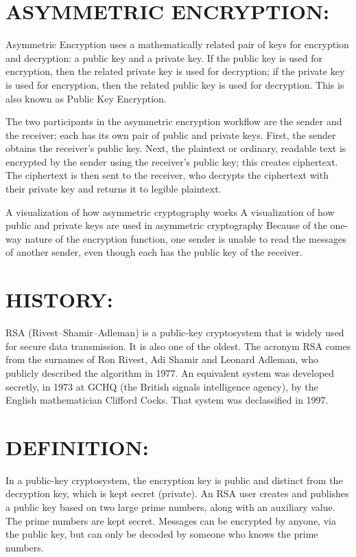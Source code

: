 \documentclass[10pt,fleqn]{article}
\begin{document}
\bigskip{}


\section{ASYMMETRIC ENCRYPTION:}

Asymmetric Encryption uses a mathematically related pair of keys for
encryption and decryption: a public key and a private key. If the
public key is used for encryption, then the related private key is
used for decryption; if the private key is used for encryption, then
the related public key is used for decryption. This is also known
as Public Key Encryption. 

The two participants in the asymmetric encryption workflow are the
sender and the receiver; each has its own pair of public and private
keys. First, the sender obtains the receiver's public key. Next, the
plaintext or ordinary, readable text is encrypted by the sender using
the receiver's public key; this creates ciphertext. The ciphertext
is then sent to the receiver, who decrypts the ciphertext with their
private key and returns it to legible plaintext.

A visualization of how asymmetric cryptography works A visualization
of how public and private keys are used in asymmetric cryptography
Because of the one-way nature of the encryption function, one sender
is unable to read the messages of another sender, even though each
has the public key of the receiver.

\bigskip{}


\section{HISTORY:}

RSA (Rivest--Shamir--Adleman) is a public-key cryptosystem that
is widely used for secure data transmission. It is also one of the
oldest. The acronym RSA comes from the surnames of Ron Rivest, Adi
Shamir and Leonard Adleman, who publicly described the algorithm in
1977. An equivalent system was developed secretly, in 1973 at GCHQ
(the British signals intelligence agency), by the English mathematician
Clifford Cocks. That system was declassified in 1997.

\bigskip{}


\section{DEFINITION:}

In a public-key cryptosystem, the encryption key is public and distinct
from the decryption key, which is kept secret (private). An RSA user
creates and publishes a public key based on two large prime numbers,
along with an auxiliary value. The prime numbers are kept secret.
Messages can be encrypted by anyone, via the public key, but can only
be decoded by someone who knows the prime numbers.
\end{document}
